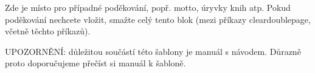 \documentclass{template-definitions/thesistbuinzlin}
\begin{document}
\maketitle



\insertabstractandkeywords


\cleardoublepage
Zde je místo pro případné poděkování, popř. motto, úryvky knih atp.
Pokud poděkování nechcete vložit, smažte celý tento blok 
(mezi příkazy cleardoublepage, včetně těchto příkazů).

{\bigskip
\color{red}UPOZORNĚNÍ: důležitou součástí této šablony je manuál s návodem. Důrazně proto doporučujeme přečíst si manuál k šabloně.}
\cleardoublepage


\insertcontents  %


\insertlistoffigures  %

\insertlistoftables  %



\insertlistofappendices  %


\paragraphindentationstart  %
\cleardoublepage					  %



\iffame  \fi
\end{document}
